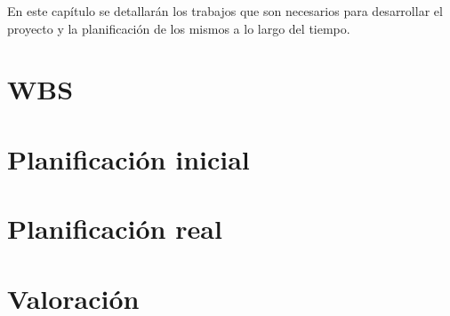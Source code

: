 En este capítulo se detallarán los trabajos que son necesarios para desarrollar el proyecto y la planificación de los mismos a lo largo del tiempo.

\section{WBS}
\label{planificacion:wbs}


\section{Planificación inicial}
\label{planificacion:inicial}


\section{Planificación real}
\label{planificacion:real}


\section{Valoración}
\label{planificacion:valoracion}
